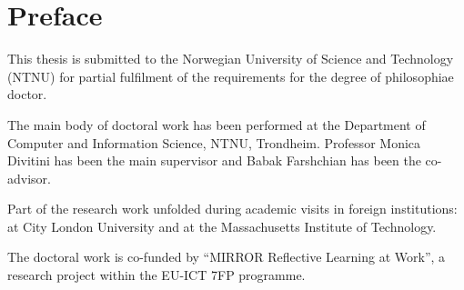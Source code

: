 \chapter{Preface}

This thesis is submitted to the Norwegian University of Science and
Technology (NTNU) for partial fulfilment of the requirements for the
degree of philosophiae doctor.

The main body of doctoral work has been performed at the Department of
Computer and Information Science, NTNU, Trondheim. Professor Monica
Divitini has been the main supervisor and Babak Farshchian has been the
co-advisor.

Part of the research work unfolded during academic visits in foreign
institutions: at City London University and at the Massachusetts
Institute of Technology.

The doctoral work is co-funded by ``MIRROR Reflective Learning at
Work'', a research project within the EU-ICT 7FP programme.
